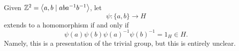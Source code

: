 \begin{eg}
	Given \(\mathbb{\MakeUppercase{z}} ^2 = \left< a, b \mid aba^{-1} b^{-1}  \right> \), let
	\[
		\psi \colon \{a, b\}\to H
	\]
	extends to a homomorphism if and only if
	\[
		\psi (a)\psi (b)\psi (a)^{-1} \psi (b)^{-1} = 1_H\in H.
	\]
	Namely, this is a presentation of the trivial group, but this is entirely unclear.
\end{eg}